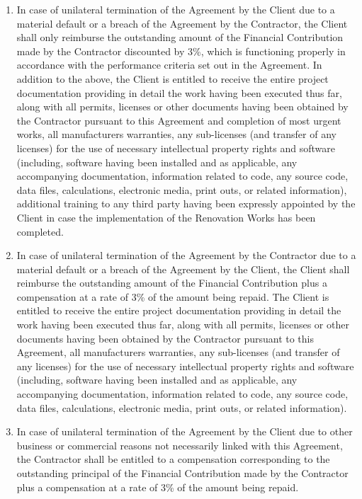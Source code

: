 \begin{multicols}{2}
\begin{enumerate}
\begin{enumerate}
		\item	In case of unilateral termination of the Agreement by the Client due to a material default or a breach of the Agreement by the Contractor, the Client shall only reimburse the outstanding amount of the Financial Contribution made by the Contractor discounted by 3\%, which is functioning properly in accordance with the performance criteria set out in the Agreement. In addition to the above, the Client is entitled to receive the entire project documentation providing in detail the work having been executed thus far, along with all permits, licenses or other documents having been obtained by the Contractor pursuant to this Agreement and completion of most urgent works, all manufacturers warranties, any sub-licenses (and transfer of any licenses) for the use of necessary intellectual property rights and software (including, software having been installed and as applicable, any accompanying documentation, information related to code, any source code, data files, calculations, electronic media, print outs, or related information), additional training to any third party having been expressly appointed by the Client in case the implementation of the Renovation Works has been completed.
		\item	In case of unilateral termination of the Agreement by the Contractor due to a material default or a breach of the Agreement by the Client, the Client shall reimburse the outstanding amount of the Financial Contribution plus a compensation at a rate of 3\% of the amount being repaid. The Client is entitled to receive the entire project documentation providing in detail the work having been executed thus far, along with all permits, licenses or other documents having been obtained by the Contractor pursuant to this Agreement, all manufacturers warranties, any sub-licenses (and transfer of any licenses) for the use of necessary intellectual property rights and software (including, software having been installed and as applicable, any accompanying documentation, information related to code, any source code, data files, calculations, electronic media, print outs, or related information).
		\item	In case of unilateral termination of the Agreement by the Client due to other business or commercial reasons not necessarily linked with this Agreement, the Contractor shall be entitled to a compensation corresponding to the outstanding principal of the Financial Contribution made by the Contractor plus a compensation at a rate of 3\% of the amount being repaid.

\end{enumerate}
\end{enumerate}
\end{multicols}
